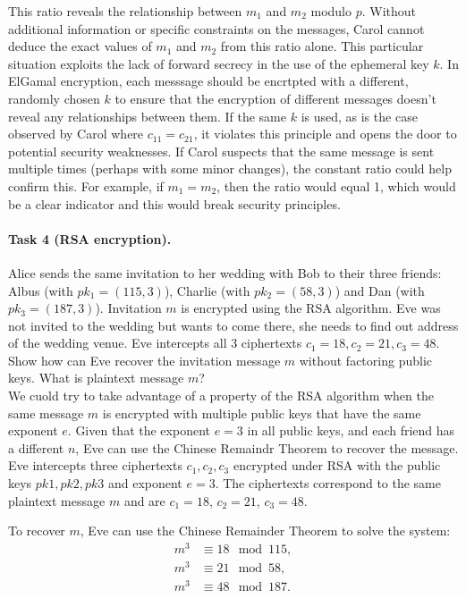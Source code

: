 \documentclass{article}
\begin{document}
This ratio reveals the relationship between \( m_1 \) and \( m_2 \) modulo \( p \).
Without additional information or specific constraints on the messages, Carol cannot deduce the exact values of \( m_1 \) and \( m_2 \) from this ratio alone.
This particular situation exploits the lack of forward secrecy in the use of the ephemeral key \( k \).
In ElGamal encryption, each messsage should be encrtpted with a different, randomly chosen \( k \) to ensure that the encryption of different messages doesn't reveal any relationships between them.
If the same \( k \) is used, as is the case observed by Carol where \( c_{11} = c_{21} \), it violates this principle and opens the door to potential security weaknesses.
If Carol suspects that the same message is sent multiple times (perhaps with some minor changes), the constant ratio could help confirm this.
For example, if \( m_1 = m_2 \), then the ratio would equal 1, which would be a clear indicator and this would break security principles.



\paragraph{Task 4 (RSA encryption).} Alice sends the same invitation to her wedding with Bob to their three friends: Albus (with $pk_1=(115,3)$), Charlie (with $pk_2=(58,3)$) and Dan (with $pk_3=(187,3)$). Invitation $m$ is encrypted using the RSA algorithm.
Eve was not invited to the wedding but wants to come there, she needs to find out address of the wedding venue.
Eve intercepts all $3$ ciphertexts $c_1= 18,c_2= 21,c_3= 48$.
Show how can Eve recover the invitation message $m$ without factoring public keys.
What is plaintext message $m$?\\

We cuold try to take advantage of a property of the RSA algorithm when the same message \( m \) is encrypted with multiple public keys that have the same exponent \( e \).
Given that the exponent \( e = 3 \) in all public keys, and each friend has a different \( n \), Eve can use the Chinese Remaindr Theorem to recover the message.
Eve intercepts three ciphertexts \( c_1, c_2, c_3 \) encrypted under RSA with the public keys \( pk1, pk2, pk3 \) and exponent \( e = 3 \).
The ciphertexts correspond to the same plaintext message \( m \) and are \( c_1 = 18 \), \( c_2 = 21 \), \( c_3 = 48 \).

To recover \( m \), Eve can use the Chinese Remainder Theorem to solve the system:
\begin{align*}
    m^3 &\equiv 18 \mod 115, \\
    m^3 &\equiv 21 \mod 58, \\
    m^3 &\equiv 48 \mod 187.
\end{align*}
\end{document}

